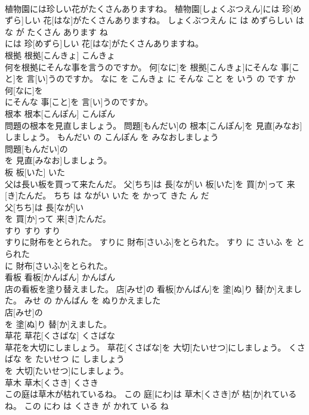 \documentclass[8pt]{extreport}
\begin{document}
\begin{CJK}{UTF8}{min}
\\	植物園には珍しい花がたくさんありますね。	植物園[しょくぶつえん]には 珍[めずら]しい 花[はな]がたくさんありますね。	しょくぶつえん に は めずらしい はな が たくさん あります ね	
\\	には 珍[めずら]しい 花[はな]がたくさんありますね。			
\\	根拠	根拠[こんきょ]	こんきょ	
\\	何を根拠にそんな事を言うのですか。	何[なに]を 根拠[こんきょ]にそんな 事[こと]を 言[い]うのですか。	なに を こんきょ に そんな こと を いう の です か	
\\	何[なに]を
\\	にそんな 事[こと]を 言[い]うのですか。			
\\	根本	根本[こんぽん]	こんぽん	
\\	問題の根本を見直しましょう。	問題[もんだい]の 根本[こんぽん]を 見直[みなお]しましょう。	もんだい の こんぽん を みなおしましょう	
\\	問題[もんだい]の
\\	を 見直[みなお]しましょう。			
\\	板	板[いた]	いた	
\\	父は長い板を買って来たんだ。	父[ちち]は 長[なが]い 板[いた]を 買[か]って 来[き]たんだ。	ちち は ながい いた を かって きた ん だ	
\\	父[ちち]は 長[なが]い
\\	を 買[か]って 来[き]たんだ。			
\\	すり	すり	すり	
\\	すりに財布をとられた。	すりに 財布[さいふ]をとられた。	すり に さいふ を とられた	
\\	に 財布[さいふ]をとられた。			
\\	看板	看板[かんばん]	かんばん	
\\	店の看板を塗り替えました。	店[みせ]の 看板[かんばん]を 塗[ぬ]り 替[か]えました。	みせ の かんばん を ぬりかえました	
\\	店[みせ]の
\\	を 塗[ぬ]り 替[か]えました。			
\\	草花	草花[くさばな]	くさばな	
\\	草花を大切にしましょう。	草花[くさばな]を 大切[たいせつ]にしましょう。	くさばな を たいせつ に しましょう	
\\	を 大切[たいせつ]にしましょう。			
\\	草木	草木[くさき]	くさき	
\\	この庭は草木が枯れているね。	この 庭[にわ]は 草木[くさき]が 枯[か]れているね。	この にわ は くさき が かれて いる ね	

\end{CJK}
\end{document}
